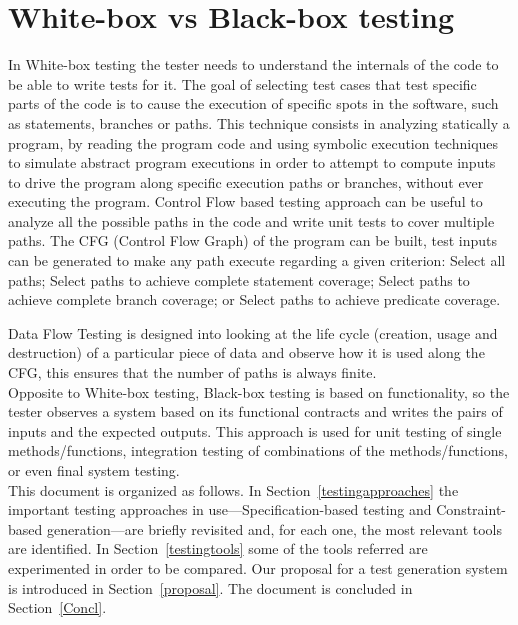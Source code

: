 \section{White-box vs Black-box testing}
In White-box testing the tester needs to understand the internals of
the code to be able to write tests for it.
The goal of selecting test cases that test specific parts of the code
is to cause the execution of specific spots in the software, such as
statements, branches or
paths.
This technique consists in analyzing statically a program, by reading
the program code and using symbolic execution techniques to simulate
abstract program
executions in order to attempt to compute inputs to drive the program
along specific execution paths or branches, without ever executing the
program. Control Flow based testing approach can be useful to analyze all the
possible paths in the code and write unit tests to cover multiple paths.
The CFG (Control Flow Graph) of the program can be built,
test inputs can be generated to make any path execute regarding a given criterion:
Select all paths;
Select paths to achieve complete statement
coverage\cite{stt,Ntafos:1988:CST:630792.631017};
Select paths to achieve complete branch coverage\cite{Roper1994,stt};
or Select paths to achieve predicate
coverage\cite{stt,Ntafos:1988:CST:630792.631017}.

Data Flow Testing is designed into looking at the life cycle
(creation, usage and destruction) of a particular
piece of data and observe how it is used along the CFG, this ensures
that the number of paths is always finite\cite{dataflow}.\\

Opposite to White-box testing, Black-box testing is based on
functionality, so the tester observes a system based
on its functional contracts and writes the pairs of inputs and the
expected outputs.
This approach is used for unit testing of single methods/functions,
integration testing
of combinations of the methods/functions, or even final system testing.\\

This document is organized as follows.
In Section~\ref{testingapproaches} the important testing approaches in
use---Specification-based testing and Constraint-based generation---are briefly
revisited and, for each one,  the most relevant tools are identified.
In Section~\ref{testingtools} some of the tools referred are
experimented in order to be compared.
Our proposal for a test generation system is introduced in
Section~\ref{proposal}.
The document is concluded in Section~\ref{Concl}.

